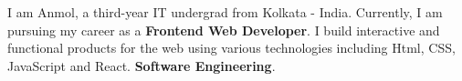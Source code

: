 
I am Anmol, a third-year IT undergrad from Kolkata - India. Currently, I am pursuing my career as a \textbf{Frontend Web Developer}. I build interactive and functional products for the web using various technologies including Html, CSS, JavaScript and React. \textbf{Software Engineering}.